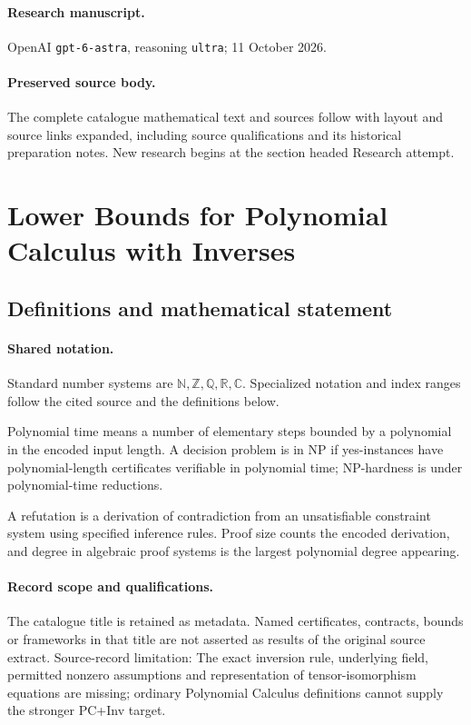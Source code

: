 \documentclass[11pt]{article}
\begin{document}
\paragraph{Research manuscript.} OpenAI \texttt{gpt-6-astra}, reasoning \texttt{ultra}; 11 October 2026.
\paragraph{Preserved source body.} The complete catalogue mathematical text and sources follow with layout and source links expanded, including source qualifications and its historical preparation notes. New research begins at the section headed Research attempt.

\section{Lower Bounds for Polynomial Calculus with Inverses}\label{statement}

\subsection{Definitions and mathematical statement}

\paragraph{Shared notation.}Standard number systems are $\mathbb N,\mathbb Z,\mathbb Q,\mathbb R,\mathbb C$. Specialized notation and index ranges follow the cited source and the definitions below.


Polynomial time means a number of elementary steps bounded by a polynomial in the encoded input length. A decision problem is in $\mathrm{NP}$ if yes-instances have polynomial-length certificates verifiable in polynomial time; NP-hardness is under polynomial-time reductions.

A refutation is a derivation of contradiction from an unsatisfiable constraint system using specified inference rules. Proof size counts the encoded derivation, and degree in algebraic proof systems is the largest polynomial degree appearing.
\paragraph{Record scope and qualifications.}
The catalogue title is retained as metadata. Named certificates, contracts, bounds or frameworks in that title are not asserted as results of the original source extract.
Source-record limitation: The exact inversion rule, underlying field, permitted nonzero assumptions and representation of tensor-isomorphism equations are missing; ordinary Polynomial Calculus definitions cannot supply the stronger PC+Inv target.
\end{document}
